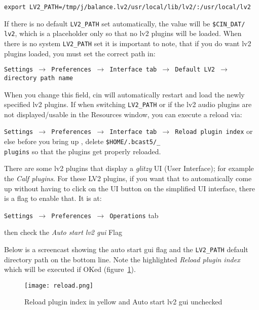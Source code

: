 \begin{lstlisting}[numbers=none]
export LV2_PATH=/tmp/j/balance.lv2/usr/local/lib/lv2/:/usr/local/lv2
\end{lstlisting}

If there is no default \texttt{LV2\_PATH} set automatically, the value will be \texttt{\$CIN\_DAT/\\lv2}, which is a placeholder only so that no lv2 plugins will be loaded. When there is no system \texttt{LV2\_PATH} set it is important to note, that if you do want lv2 plugins loaded, you must set the correct path in:

\texttt{Settings $\rightarrow$ Preferences $\rightarrow$ Interface tab $\rightarrow$ Default LV2 $\rightarrow$ direc\-tory
    path name}

When you change this field, cin will automatically restart and load the newly specified lv2 plugins. If when switching \texttt{LV2\_PATH} or if the lv2 audio plugins are not displayed/usable in the Resources window, you can execute a reload via:

\texttt{Settings $\rightarrow$  Preferences $\rightarrow$ Interface tab $\rightarrow$ Reload plugin in\-dex}
or else before you bring up \CGG{}, delete \texttt{\$HOME/.bcast5/\CGG{}\_\\plugins} so that the plugins get properly reloaded.

There are some lv2 plugins that display a \textit{glitzy} UI (User Interface); for example the \textit{Calf plugins}. For these LV2 plugins, if you want that to automatically come up without having to click on the UI button on the simplified UI interface, there is a flag to enable that. It is at:

\texttt{Settings $\rightarrow$ Preferences $\rightarrow$ Operations} tab

then check the \textit{Auto start lv2 gui} Flag

Below is a screencast showing the auto start gui flag and the \texttt{LV2\_PATH} default directory path on the bottom line. Note the highlighted \textit{Reload plugin index} which will be executed if OKed (figure~\ref{fig:reload}).

\begin{figure}[htpb]
    \centering
    \texttt{[image: reload.png]}
    \caption{Reload plugin index in yellow and Auto start lv2 gui unchecked}
    \label{fig:reload}
\end{figure}

